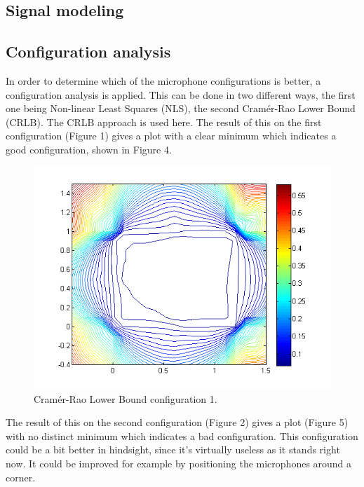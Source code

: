 \documentclass[11pt]{article}
\begin{document}
\subsection{Signal modeling}


\subsection{Configuration analysis}
In order to determine which of the microphone configurations is better, a configuration analysis is applied. This can be done in two different ways, the first one being Non-linear Least Squares (NLS), the second Cramér-Rao Lower Bound (CRLB). The CRLB approach is used here. The result of this on the first configuration (Figure 1) gives a plot with a clear minimum which indicates a good configuration, shown in Figure 4.\\
\begin{figure}
\begin{center}
  \includegraphics[width=\textwidth]{crlb_1.png}
  \caption{Cramér-Rao Lower Bound configuration 1.}
  \end{center}
\end{figure}
The result of this on the second configuration (Figure 2) gives a plot (Figure 5) with no distinct minimum which indicates a bad configuration. This configuration could be a bit better in hindsight, since it's virtually useless as it stands right now. It could be improved  for example by positioning the microphones around a corner.
\end{document}

